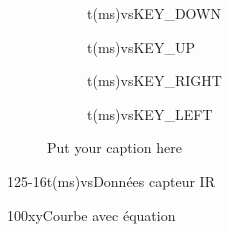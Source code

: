 \documentclass[12pt]{article}
\begin{document}
\begin{figure}
\begin{subfigure}{.5\textwidth}
  \centering
   \centering
 \begin{graphics}{0.9}{0.4}{-0.05}{20}{-1}{6}{t(ms)}{vs}{KEY\_DOWN}
\end{graphics}
\end{subfigure}
\begin{subfigure}{.5\textwidth}
  \centering
   \centering
 \begin{graphics}{0.9}{0.4}{-0.05}{80}{-1}{6}{t(ms)}{vs}{KEY\_UP}
\end{graphics}
\end{subfigure}

\begin{subfigure}{.5\textwidth}
  \centering
 \begin{graphics}{0.9}{0.4}{-0.05}{60}{-1}{6}{t(ms)}{vs}{KEY\_RIGHT}
\end{graphics}
\end{subfigure}
\begin{subfigure}{.5\textwidth}
  \centering
   \centering
 \begin{graphics}{0.9}{0.4}{-0.05}{40}{-1}{6}{t(ms)}{vs}{KEY\_LEFT}
\end{graphics}
\end{subfigure}
\caption{Put your caption here}
\label{fig:fig}
\end{figure}



\begin{exemple}
\begin{graphics}{0.9}{0.4}{-0.05}{125}{-1}{6}{t(ms)}{vs}{Données capteur IR}
\end{graphics}
\end{exemple}


\begin{exemple}
\begin{graphics}{0.4}{0.4}{-10}{10}{-1}{100}{x}{y}{Courbe avec équation}
\end{graphics}
\end{exemple}
\end{document}
